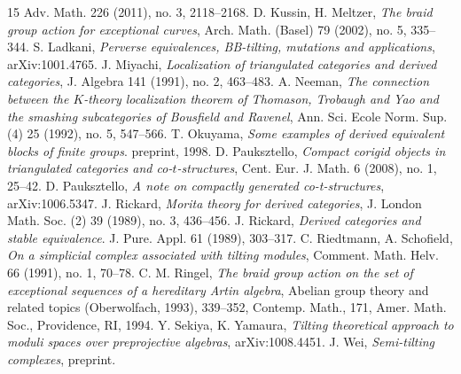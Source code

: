\documentclass[a4paper,reqno]{amsart}
\theoremstyle{definition}
\begin{document}
\begin{thebibliography}{15}
Adv. Math. 226 (2011), no. 3, 2118--2168.
 D. Kussin, H. Meltzer, \emph{The braid group action for exceptional curves}, 
Arch. Math. (Basel) 79 (2002), no. 5, 335--344. 
 S. Ladkani, \emph{Perverse equivalences, BB-tilting, mutations and applications}, arXiv:1001.4765.
 J. Miyachi, \emph{Localization of triangulated categories and derived categories}, J. Algebra 141 (1991), no. 2, 463--483.
 A. Neeman, \emph{The connection between the $K$-theory localization theorem of Thomason, 
Trobaugh and Yao and the smashing subcategories of Bousfield and Ravenel},
Ann. Sci. Ecole Norm. Sup. (4) 25 (1992), no. 5, 547--566.
 T. Okuyama, \emph{Some examples of derived equivalent blocks of finite groups}. 
preprint, 1998. 
 D. Pauksztello, \emph{Compact corigid objects in triangulated categories and co-$t$-structures},  
Cent. Eur. J. Math.  6  (2008),  no. 1, 25--42. 
 D. Pauksztello, \emph{A note on compactly generated co-t-structures}, arXiv:1006.5347.
 J. Rickard, \emph{Morita theory for derived categories}, J. London Math. Soc. (2) 39 (1989), no. 3, 436--456. 
 J. Rickard, \emph{Derived categories and stable equivalence}. 
J. Pure. Appl. 61 (1989), 303--317.
 C. Riedtmann, A. Schofield,
\emph{On a simplicial complex associated with tilting modules},
Comment. Math. Helv. 66 (1991), no. 1, 70--78. 
 C. M. Ringel, \emph{The braid group action on the set of exceptional sequences of a hereditary Artin algebra}, 
Abelian group theory and related topics (Oberwolfach, 1993), 339--352, Contemp. Math., 171, Amer. Math. Soc., Providence, RI, 1994.
 Y. Sekiya, K. Yamaura, \emph{Tilting theoretical approach to moduli spaces over preprojective algebras}, arXiv:1008.4451.
 J. Wei, \emph{Semi-tilting complexes}, preprint.
\end{thebibliography}
\end{document}
